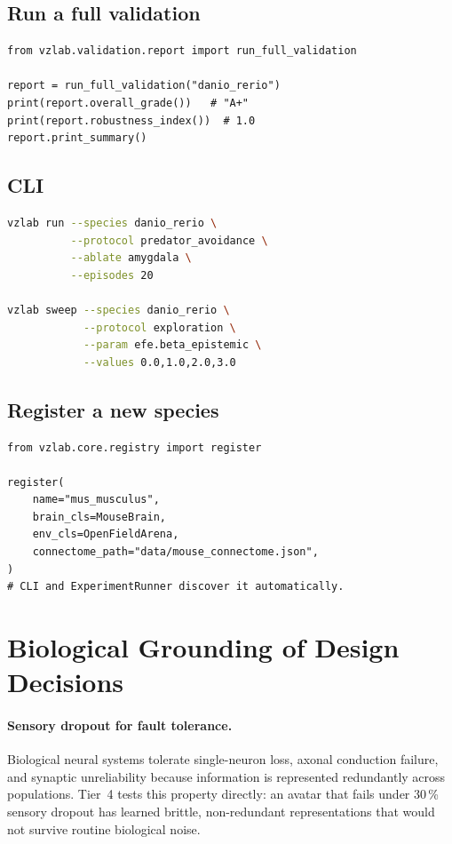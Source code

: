 \documentclass[11pt,a4paper]{article}
\begin{document}
\subsection{Run a full validation}

\begin{lstlisting}
from vzlab.validation.report import run_full_validation

report = run_full_validation("danio_rerio")
print(report.overall_grade())   # "A+"
print(report.robustness_index())  # 1.0
report.print_summary()
\end{lstlisting}

\subsection{CLI}

\begin{lstlisting}[language=bash]
vzlab run --species danio_rerio \
          --protocol predator_avoidance \
          --ablate amygdala \
          --episodes 20

vzlab sweep --species danio_rerio \
            --protocol exploration \
            --param efe.beta_epistemic \
            --values 0.0,1.0,2.0,3.0
\end{lstlisting}

\subsection{Register a new species}

\begin{lstlisting}
from vzlab.core.registry import register

register(
    name="mus_musculus",
    brain_cls=MouseBrain,
    env_cls=OpenFieldArena,
    connectome_path="data/mouse_connectome.json",
)
# CLI and ExperimentRunner discover it automatically.
\end{lstlisting}

\section{Biological Grounding of Design Decisions}

\paragraph{Sensory dropout for fault tolerance.}
Biological neural systems tolerate single-neuron loss, axonal
conduction failure, and synaptic unreliability because information is
represented redundantly across populations.
Tier~4 tests this property directly: an avatar that fails under 30\,\%
sensory dropout has learned brittle, non-redundant representations
that would not survive routine biological noise.
\end{document}
